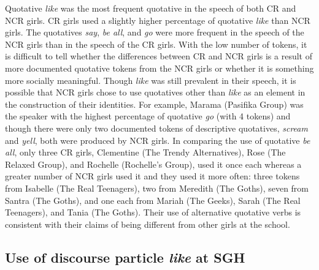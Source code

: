 Quotative \textit{like} was the most frequent quotative in the speech of both CR and NCR girls.  CR girls used a slightly higher percentage of quotative \textit{like} than NCR girls.  The quotatives \textit{say}, \textit{be all}, and \textit{go} were more frequent in the speech of the NCR girls than in the speech of the CR girls.  With the low number of tokens, it is difficult to tell whether the differences between CR and NCR girls is a result of more documented quotative tokens from the NCR girls or whether it is something more socially meaningful.  Though \textit{like} was still prevalent in their speech, it is possible that NCR girls chose to use quotatives other than \textit{like} as an element in the construction of their identities.  For example, Marama (Pasifika Group) was the speaker with the highest percentage of quotative \textit{go} (with 4 tokens) and though there were only two documented tokens of descriptive quotatives, \textit{scream} and \textit{yell}, both were produced by NCR girls.  In comparing the use of quotative \textit{be all}, only three CR girls, Clementine (The Trendy Alternatives), Rose (The Relaxed Group), and Rochelle (Rochelle's Group), used it once each whereas a greater number of NCR girls used it and they used it more often: three tokens from Isabelle (The Real Teenagers), two from Meredith (The Goths), seven from Santra (The Goths), and one each from Mariah (The Geeks), Sarah (The Real Teenagers), and Tania (The Goths).  Their use of alternative quotative verbs is consistent with their claims of being different from other girls at the school.







\subsection{Use of discourse particle \textit{like} at SGH}\label{section:dplike}

